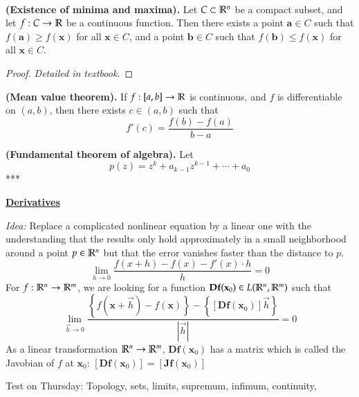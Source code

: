 \\

\begin{theorem}
  \textbf{(Existence of minima and maxima).} Let $C\subset \mathbb{R}^n$ be a compact subset, and let $f : C\rightarrow \mathbb{R}$ be a continuous function. Then there exists a point $\bm{a}\in C$ such that $f(\bm{a})\geq f(\bm{x})$ for all $\bm{x}\in C$, and a point $\bm{b}\in C$ such that $f(\bm{b})\leq f(\bm{x})$ for all $\bm{x}\in C$.
\end{theorem}
\begin{proof}
  \textit{Detailed in textbook. }
\end{proof}

\theorem
{
  \textbf{(Mean value theorem).} If $f : [a,b] \rightarrow \mathbb{R}$ is continuous, and $f$ is differentiable on $(a,b)$, then there exists $c\in (a,b)$ such that
  \[f'(c)=\frac{f(b)-f(a)}{b-a}\]
}

\theorem
{
  \textbf{(Fundamental theorem of algebra).} Let
  \[p(z)=z^k+a_{k-1}z^{k-1}+\cdots + a_0\]
  ***
}

\textbf{\ul{Derivatives}}

\textit{Idea:} Replace a complicated nonlinear equation by a linear one with the understanding that the results only hold approximately in a small neighborhood around a point $p\in \mathbb{R}^n$ but that the error vanishes faster than the distance to $p$.
\[\lim_{h\rightarrow 0} \frac{f(x+h)-f(x)-f'(x)\cdot h}{h}=0\]
For $f : \mathbb{R}^n \rightarrow \mathbb{R}^m$, we are looking for a function $\textbf{Df}(\textbf{x}_0)\in L(\mathbb{R}^n,\mathbb{R}^m)$ such that
\[\lim_{\vec{h}\rightarrow 0} \frac{\left\{f(\bm{x}+\vec{h})-f(\bm{x})\right\}-\left\{[\bm{Df}(\bm{x}_0)]\vec{h}\right\}}{|\vec{h}|}=0\]
As a linear transformation $\mathbb{R}^n\rightarrow \mathbb{R}^m$, $\bm{Df}(\bm{x}_0)$ has a matrix which is called the Javobian of $f$ at $\bm{x}_0$: $[\bm{Df}(\bm{x}_0)]=[\bm{Jf}(\bm{x}_{0})]$

Test on Thursday:
Topology, sets, limits, supremum, infimum, continuity,
